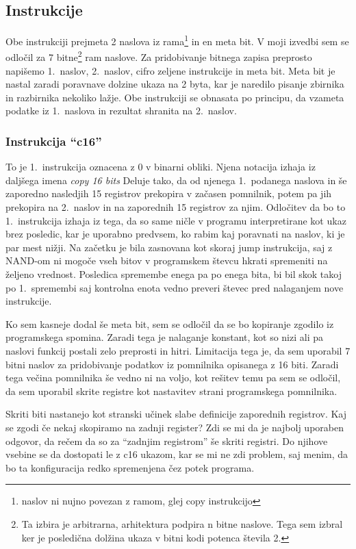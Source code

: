 \documentclass[12pt]{article}
\begin{document}
\subsection{Instrukcije}
Obe instrukciji prejmeta 2 naslova iz rama\footnote{naslov ni nujno povezan z ramom, glej copy instrukcijo} in en meta bit.
V moji izvedbi sem se odločil za 7 bitne\footnote{Ta izbira je arbitrarna, arhitektura podpira n bitne naslove. Tega sem izbral ker je posledična dolžina ukaza v bitni kodi potenca števila 2.} ram naslove.
Za pridobivanje bitnega zapisa preprosto napišemo 1.\ naslov, 2.\ naslov, cifro zeljene instrukcije in meta bit.
Meta bit je nastal zaradi poravnave dolzine ukaza na 2 byta, kar je naredilo pisanje zbirnika in razbirnika nekoliko lažje.
Obe instrukciji se obnasata po principu, da vzameta podatke iz 1.\ naslova in rezultat shranita na 2.\ naslov.

\subsubsection{Instrukcija ``c16''}
To je 1.\ instrukcija oznacena z 0 v binarni obliki.
Njena notacija izhaja iz daljšega imena \textit{copy 16 bits}
Deluje tako, da od njenega 1.\ podanega naslova in še zaporedno nasledjih 15 registrov prekopira v začasen pomnilnik, potem pa jih prekopira na 2.\ naslov in na zaporednih 15 registrov za njim.
Odločitev da bo to 1.\ instrukcija izhaja iz tega, da so same ničle v programu interpretirane kot ukaz brez posledic, kar je uporabno predvsem, ko rabim kaj poravnati na naslov, ki je par mest nižji.
Na začetku je bila zasnovana kot skoraj jump instrukcija, saj z NAND-om ni mogoče vseh bitov v programskem števcu hkrati spremeniti na željeno vrednost.
Posledica spremembe enega pa po enega bita, bi bil skok takoj po 1.\ spremembi saj kontrolna enota vedno preveri števec pred nalaganjem nove instrukcije.

Ko sem kasneje dodal še meta bit, sem se odločil da se bo kopiranje zgodilo iz programskega spomina.
Zaradi tega je nalaganje konstant, kot so nizi ali pa naslovi funkcij postali zelo preprosti in hitri.
Limitacija tega je, da sem uporabil 7 bitni naslov za pridobivanje podatkov iz pomnilnika opisanega z 16 biti.
Zaradi tega večina pomnilnika še vedno ni na voljo, kot rešitev temu pa sem se odločil, da sem uporabil skrite registre kot nastavitev strani programskega pomnilnika.

Skriti biti nastanejo kot stranski učinek slabe definicije zaporednih registrov.
Kaj se zgodi če nekaj skopiramo na zadnji register?
Zdi se mi da je najbolj uporaben odgovor, da rečem da so za ``zadnjim registrom'' še skriti registri.
Do njihove vsebine se da dostopati le z c16 ukazom, kar se mi ne zdi problem, saj menim, da bo ta konfiguracija redko spremenjena čez potek programa.
\end{document}

